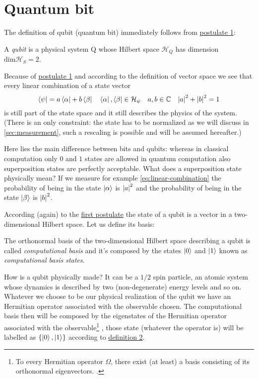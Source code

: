 \section{Quantum bit}
The definition of qubit (quantum bit) immediately follows from \hyperref[postulate:1]{postulate 1}:
\begin{defn}
A \emph{qubit} is a physical system Q whose Hilbert space $\mathcal{H}_Q$ has dimension $\text{dim}\mathcal{H}_S = 2$.
\end{defn}
Because of \hyperref[postulate:1]{postulate 1} and according to the definition of vector space we see that every linear combination of a state vector
\begin{equation}\label{eq:linear-combination}
    \bra{\psi} = a \bra{\alpha} + b \bra{\beta} \quad \bra{\alpha},\bra{\beta} \in \mathcal{H}_\psi \quad a,b \in \mathbb{C} \quad \abs{a}^2 + \abs{b}^2 = 1
\end{equation}
is still part of the state space and it still describes the physics of the system. (There is an only constraint: the state has to be normalized as we will discuss in \ref{sec:measurement}, such a rescaling is possible and will be assumed hereafter.) 

Here lies the main difference between bits and qubits: whereas in classical computation only $0$ and $1$ states are allowed in quantum computation also superposition states are perfectly acceptable. What does a superposition state physically mean? If we measure for example \ref{eq:linear-combination} the probability of being in the state $\ket{\alpha}$ is  $\abs{a}^2$ and the probability of being in the state $\ket{\beta}$ is $\abs{b}^2$.

According (again) to the \hyperref[postulate:1]{first postulate} the state of a qubit is a vector in a two-dimensional Hilbert space. Let us define its basis:
\begin{defn}\label{def:computational-basis}
The orthonormal basis of the two-dimensional Hilbert space describing a qubit is called \emph{computational basis} and it's composed by the states $\ket{0}$ and $\ket{1}$ known as \emph{computational basis states}.
\end{defn}
How is a qubit physically made?
It can be a $1/2$ spin particle, an atomic system whose dynamics is described by two (non-degenerate) energy levels and so on.
Whatever we choose to be our physical realization of the qubit we have an Hermitian operator associated with the observable chosen. The computational basis then will be composed by the eigenstates of the Hermitian operator associated with the observable\footnote{To every Hermitian operator $\Omega$, there exist (at least) a basis consisting of its orthonormal eigenvectors. \cite[p.36]{Shankar}.} , those state (whatever the operator is) will be labelled as $\{\ket{0},\ket{1}\}$ according to \hyperref[def:computational-basis]{definition 2}.


